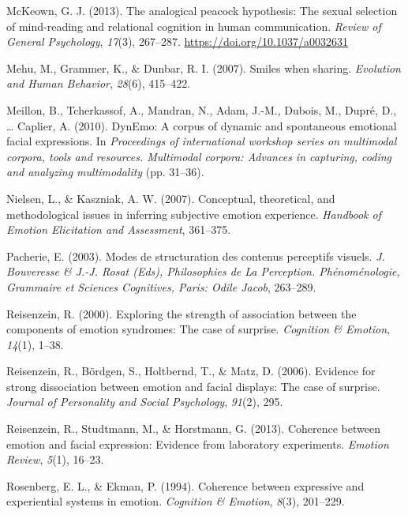 \documentclass[man]{apa6}
\begin{document}
\leavevmode\hypertarget{ref-mckeown2013analogical}{}%
McKeown, G. J. (2013). The analogical peacock hypothesis: The sexual selection of mind-reading and relational cognition in human communication. \emph{Review of General Psychology}, \emph{17}(3), 267--287. \url{https://doi.org/10.1037/a0032631}

\leavevmode\hypertarget{ref-mehu2007smiles}{}%
Mehu, M., Grammer, K., \& Dunbar, R. I. (2007). Smiles when sharing. \emph{Evolution and Human Behavior}, \emph{28}(6), 415--422.

\leavevmode\hypertarget{ref-meillon2010dynemo}{}%
Meillon, B., Tcherkassof, A., Mandran, N., Adam, J.-M., Dubois, M., Dupré, D., \ldots{} Caplier, A. (2010). DynEmo: A corpus of dynamic and spontaneous emotional facial expressions. In \emph{Proceedings of international workshop series on multimodal corpora, tools and resources. Multimodal corpora: Advances in capturing, coding and analyzing multimodality} (pp. 31--36).

\leavevmode\hypertarget{ref-nielsen2007conceptual}{}%
Nielsen, L., \& Kaszniak, A. W. (2007). Conceptual, theoretical, and methodological issues in inferring subjective emotion experience. \emph{Handbook of Emotion Elicitation and Assessment}, 361--375.

\leavevmode\hypertarget{ref-pacherie2003modes}{}%
Pacherie, E. (2003). Modes de structuration des contenus perceptifs visuels. \emph{J. Bouveresse \& J.-J. Rosat (Eds), Philosophies de La Perception. Phénoménologie, Grammaire et Sciences Cognitives, Paris: Odile Jacob}, 263--289.

\leavevmode\hypertarget{ref-reisenzein2000exploring}{}%
Reisenzein, R. (2000). Exploring the strength of association between the components of emotion syndromes: The case of surprise. \emph{Cognition \& Emotion}, \emph{14}(1), 1--38.

\leavevmode\hypertarget{ref-reisenzein2006evidence}{}%
Reisenzein, R., Bördgen, S., Holtbernd, T., \& Matz, D. (2006). Evidence for strong dissociation between emotion and facial displays: The case of surprise. \emph{Journal of Personality and Social Psychology}, \emph{91}(2), 295.

\leavevmode\hypertarget{ref-reisenzein2013coherence}{}%
Reisenzein, R., Studtmann, M., \& Horstmann, G. (2013). Coherence between emotion and facial expression: Evidence from laboratory experiments. \emph{Emotion Review}, \emph{5}(1), 16--23.

\leavevmode\hypertarget{ref-rosenberg1994coherence}{}%
Rosenberg, E. L., \& Ekman, P. (1994). Coherence between expressive and experiential systems in emotion. \emph{Cognition \& Emotion}, \emph{8}(3), 201--229.
\end{document}
